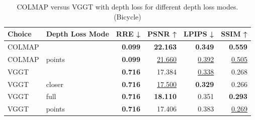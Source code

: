 \begin{table}[H]
\caption{\ifdefined\customcaption \customcaption \else COLMAP versus VGGT with depth loss for different depth loss modes. (Bicycle) \fi}
\label{tab:05_depth_loss_mode_bicycle}
\centering
\scriptsize
\begin{tabular}{llrrrr}
\toprule
Choice & Depth Loss Mode & RRE ↓ & PSNR ↑ & LPIPS ↓ & SSIM ↑ \\
\midrule
COLMAP &  & \textbf{0.099} & \textbf{22.163} & \textbf{0.349} & \textbf{0.559} \\
COLMAP & points & \textbf{0.099} & \underline{21.660} & \underline{0.392} & \underline{0.505} \\
\midrule
VGGT &  & \textbf{0.716} & 17.384 & \underline{0.338} & 0.268 \\
VGGT & closer & \textbf{0.716} & \underline{17.500} & \textbf{0.329} & 0.266 \\
VGGT & full & \textbf{0.716} & \textbf{18.110} & 0.351 & \textbf{0.293} \\
VGGT & points & \textbf{0.716} & 17.406 & 0.383 & \underline{0.269} \\
\bottomrule
\end{tabular}
\end{table}